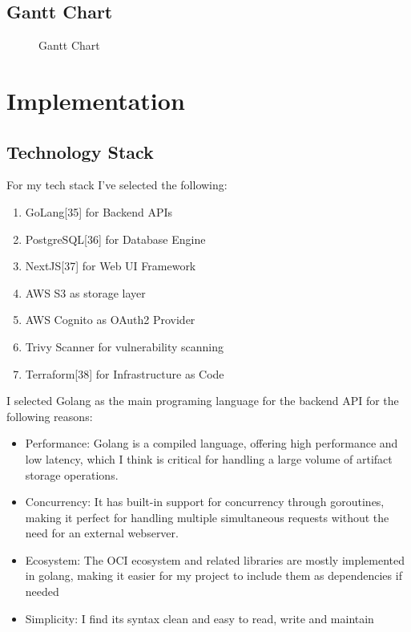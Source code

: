 \documentclass{article}
\newcommand{\widefig}[3][1.2\textwidth]{%
  \begin{figure}[H]
    \makebox[\textwidth][c]{%
      \texttt{[image: \#2]}%
    }
    \caption{#3}
  \end{figure}
}
\begin{document}
  \subsection{Gantt Chart}
  \newpage
  \widefig[1.1\textwidth]{gantt.png}{Gantt Chart}

  \section{Implementation}

  \subsection{Technology Stack}

  For my tech stack I've selected the following:
  \begin{enumerate}
    \item GoLang[35] for Backend APIs
    \item PostgreSQL[36] for Database Engine
    \item NextJS[37] for Web UI Framework
    \item AWS S3 as storage layer
    \item AWS Cognito as OAuth2 Provider
    \item Trivy Scanner for vulnerability scanning
    \item Terraform[38] for Infrastructure as Code
  \end{enumerate}

  I selected Golang as the main programing language for the backend API for the following reasons:

  \begin{itemize}
    \item Performance: Golang is a compiled language, offering high performance and low latency, which I think is critical for handling a large volume of artifact storage operations.
    \item Concurrency: It has built-in support for concurrency through goroutines, making it perfect for handling multiple simultaneous requests without the need for an external webserver.
    \item Ecosystem: The OCI ecosystem and related libraries are mostly implemented in golang, making it easier for my project to include them as dependencies if needed
    \item Simplicity: I find its syntax clean and easy to read, write and maintain
  \end{itemize}
\end{document}
